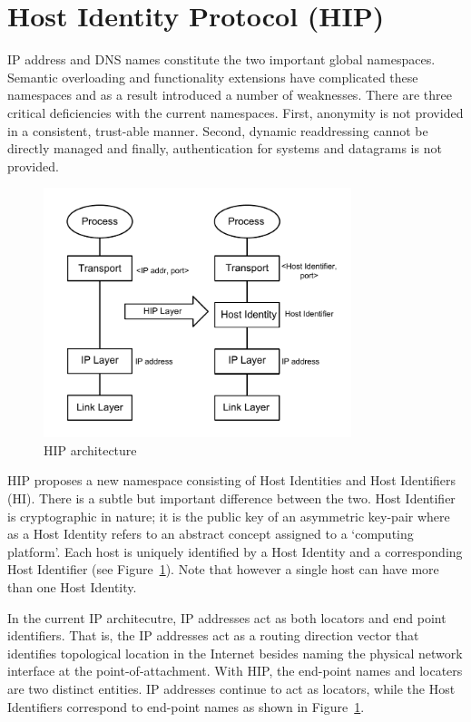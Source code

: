 
\section {Host Identity Protocol (HIP)}

IP address and DNS names constitute the two important global namespaces. Semantic overloading and functionality extensions have complicated these namespaces and as a result introduced a number of weaknesses. There are three critical deficiencies with the current namespaces.  First, anonymity is not provided in a consistent, trust-able manner. Second, dynamic readdressing cannot be directly managed and finally, authentication for systems and datagrams is not provided.

\begin{figure}[htb!]
\centering
\includegraphics[width=0.8\textwidth]{images/HIP_figure1}
\caption{HIP architecture}
\label{fig:HIP_arch}
\end{figure}

HIP \cite{HIP_rfc} proposes a new namespace consisting of Host Identities and Host Identifiers (HI). There is a subtle but important difference between the two. Host Identifier is cryptographic in nature; it is the public key of an asymmetric key-pair where as a Host Identity refers to an abstract concept assigned to a `computing platform'. Each host is uniquely identified by a Host Identity and a corresponding Host Identifier (see Figure~\ref{fig:HIP_arch}). Note that however a single host can have more than one Host Identity.

In the current IP architecutre, IP addresses act as both locators and end point identifiers. That is, the IP addresses act as a routing direction vector that identifies  topological location in the Internet besides naming the physical network interface at the point-of-attachment. With HIP, the end-point names and locaters are two distinct entities. IP addresses continue to act as locators, while the Host Identifiers correspond to end-point names as shown in Figure~\ref{fig:HIP_arch}. 

